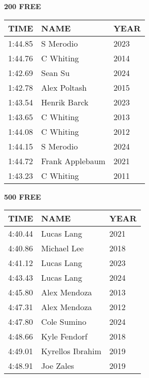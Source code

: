 \begin{table}[H]
\centering
\begin{minipage}[t]{0.48\textwidth}
\centering
\textbf{200 FREE}\\[0.1cm]
\begin{tabular}{@{}p{1.8cm}p{2.8cm}p{1.2cm}@{}}
\hline
    \textbf{TIME} & \textbf{NAME} & \textbf{YEAR} \\
\hline
    1:44.85 & S Merodio & 2023 \\
    1:44.76 & C Whiting & 2014 \\
    1:42.69 & Sean Su & 2024 \\
    1:42.78 & Alex Poltash & 2015 \\
    1:43.54 & Henrik Barck & 2023 \\
    1:43.65 & C Whiting & 2013 \\
    1:44.08 & C Whiting & 2012 \\
    1:44.15 & S Merodio & 2024 \\
    1:44.72 & Frank Applebaum & 2021 \\
    1:43.23 & C Whiting & 2011 \\
\hline
\end{tabular}
\end{minipage}\hfill
\begin{minipage}[t]{0.48\textwidth}
\centering
\textbf{500 FREE}\\[0.1cm]
\begin{tabular}{@{}p{1.8cm}p{2.8cm}p{1.2cm}@{}}
\hline
    \textbf{TIME} & \textbf{NAME} & \textbf{YEAR} \\
\hline
    4:40.44 & Lucas Lang & 2021 \\
    4:40.86 & Michael Lee & 2018 \\
    4:41.12 & Lucas Lang & 2023 \\
    4:43.43 & Lucas Lang & 2024 \\
    4:45.80 & Alex Mendoza & 2013 \\
    4:47.31 & Alex Mendoza & 2012 \\
    4:47.80 & Cole Sumino & 2024 \\
    4:48.66 & Kyle Fendorf & 2018 \\
    4:49.01 & Kyrellos Ibrahim & 2019 \\
    4:48.91 & Joe Zales & 2019 \\
\hline
\end{tabular}
\end{minipage}
\end{table}

